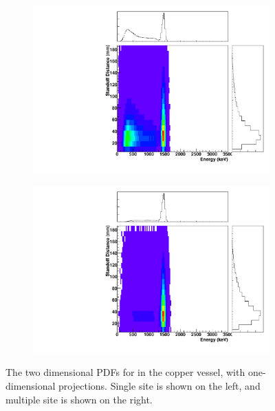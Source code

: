 \documentclass[herrin-thesis.tex]{subfiles}
\begin{document}
\begin{figure}[hp]
\centering
	\begin{subfigure}[b]{0.48\textwidth}
	\centering
	\includegraphics[width=\textwidth]{./plots/PDFs/analysis_pdf_AllVessel_K40_ss.pdf}
\end{subfigure}\hfill%
\begin{subfigure}[b]{0.48\textwidth}
	\centering
	\includegraphics[width=1\textwidth]{./plots/PDFs/analysis_pdf_AllVessel_K40_ms.pdf}
	\end{subfigure}
\caption[PDF for  in the TPC vessel]{The two dimensional PDFs for  in the copper vessel, with one-dimensional projections. Single site is shown on the left, and multiple site is shown on the right.}
\label{fig:analysis_pdf_AllVessel_K40}
\end{figure}
\end{document}
